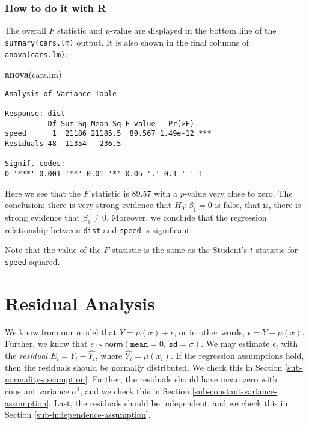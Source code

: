 \documentclass[]{book}
\newenvironment{Shaded}{\begin{snugshade}}{\end{snugshade}}
\newcommand{\KeywordTok}[1]{\textcolor[rgb]{0.13,0.29,0.53}{\textbf{{#1}}}}
\newcommand{\NormalTok}[1]{{#1}}
\numberwithin{equation}{chapter}
\numberwithin{figure}{chapter}
\theoremstyle{plain}
\theoremstyle{definition}
\theoremstyle{remark}
\theoremstyle{definition}
\theoremstyle{definition}
\theoremstyle{remark}
\begin{document}
\subsubsection{How to do it with R}\label{how-to-do-it-with-r-46}

The overall \(F\) statistic and \(p\)-value are displayed in the bottom
line of the \texttt{summary(cars.lm)} output. It is also shown in the
final columns of \texttt{anova(cars.lm)}:

\begin{Shaded}
\begin{Highlighting}[]
\KeywordTok{anova}\NormalTok{(cars.lm)}
\end{Highlighting}
\end{Shaded}

\begin{verbatim}
Analysis of Variance Table

Response: dist
          Df Sum Sq Mean Sq F value   Pr(>F)    
speed      1  21186 21185.5  89.567 1.49e-12 ***
Residuals 48  11354   236.5                     
---
Signif. codes:  
0 '***' 0.001 '**' 0.01 '*' 0.05 '.' 0.1 ' ' 1
\end{verbatim}

Here we see that the \(F\) statistic is 89.57 with a \(p\)-value very
close to zero. The conclusion: there is very strong evidence that
\(H_{0}:\beta_{1} = 0\) is false, that is, there is strong evidence that
\(\beta_{1} \neq 0\). Moreover, we conclude that the regression
relationship between \texttt{dist} and \texttt{speed} is significant.

Note that the value of the \(F\) statistic is the same as the Student's
\(t\) statistic for \texttt{speed} squared.

\section{Residual Analysis}\label{sec-residual-analysis-slr}

We know from our model that \(Y=\mu(x)+\epsilon\), or in other words,
\(\epsilon=Y-\mu(x)\). Further, we know that
\(\epsilon\sim\mathsf{norm}(\mathtt{mean}=0,\,\mathtt{sd}=\sigma)\). We
may estimate \(\epsilon_{i}\) with the \emph{residual}
\(E_{i}=Y_{i}-\hat{Y_{i}}\), where \(\hat{Y_{i}}=\hat{\mu}(x_{i})\). If
the regression assumptions hold, then the residuals should be normally
distributed. We check this in Section \ref{sub-normality-assumption}.
Further, the residuals should have mean zero with constant variance
\(\sigma^{2}\), and we check this in Section
\ref{sub-constant-variance-assumption}. Last, the residuals should be
independent, and we check this in Section
\ref{sub-independence-assumption}.
\end{document}
